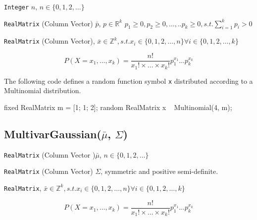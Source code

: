 \begin{itemize*}
\item[] \verb|Integer| $n$, $n \in \{0, 1, 2, \ldots \}$
\item[] \verb|RealMatrix| (Column Vector) $\bar{p}$, $p \in \mathbb{R}^{k}$ $p_{1} \geq 0, p_{2} \geq 0, \ldots, .. p_{k} \geq 0, s.t. \sum_{i=1}^{k} p_{i} > 0$
\end{itemize*}

\begin{itemize*}
\item[] \verb|RealMatrix| (Column Vector), $\bar{x} \in \mathbb{Z}^{k}, s.t. x_{i} \in \{0, 1, 2, \ldots, n \} \forall i \in \{0, 1, 2, \ldots, k \}  $ 
\end{itemize*}

\[
	P(X = x_{1},\ldots,x_{k}) = \frac{n!}{x_{1}! \times \ldots \times x_{k}!} p_{1}^{x_{1}} \ldots p_{k}^{x_{k}}
\]

The following code defines a random function symbol \verb|x| distributed according to a Multinomial distribution.
\begin{blogcode}
fixed RealMatrix m = [1; 1; 2];
random RealMatrix x ~ Multinomial(4, m);
\end{blogcode}

\subsection{MultivarGaussian($\bar{\mu}$, $\Sigma$)}

\begin{itemize*}
\item[] \verb|RealMatrix| (Column Vector )$\bar{\mu}$, $n \in \{0, 1, 2, \ldots \}$

\item[] \verb|RealMatrix| (Column Vector) $\Sigma$, symmetric and positive semi-definite.

\end{itemize*}

\begin{itemize*}
\item[] \verb|RealMatrix|, $\bar{x} \in \mathbb{Z}^{k}, s.t. x_{i} \in \{0, 1, 2, \ldots, n \} \forall i \in \{0, 1, 2, \ldots, k \}  $ 
\end{itemize*}

\[
	P(X = x_{1},\ldots,x_{k}) = \frac{n!}{x_{1}! \times \ldots \times x_{k}!} p_{1}^{x_{1}} \ldots p_{k}^{x_{k}}
\]

